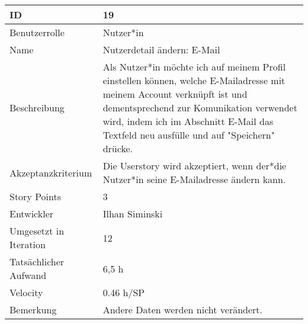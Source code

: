 \begin{tabularx}{\textwidth}{|p{}|X|}
	\hline
	ID & 19\\
	\hline
	Benutzerrolle & Nutzer*in\\
	\hline
	Name & Nutzerdetail ändern: E-Mail\\
	\hline
	Beschreibung & Als Nutzer*in möchte ich auf meinem Profil einstellen können, welche E-Mailadresse mit meinem Account verknüpft ist und dementsprechend zur Komunikation verwendet wird, indem ich im Abschnitt E-Mail das Textfeld neu ausfülle und auf "Speichern" drücke.\\
	\hline
	Akzeptanzkriterium & Die Userstory wird akzeptiert, wenn der*die Nutzer*in seine E-Mailadresse ändern kann.\\
	\hline
	Story Points & 3\\
	\hline
	Entwickler & Ilhan Siminski\\
	\hline
	Umgesetzt in Iteration & 12\\ 
	\hline
	Tatsächlicher Aufwand & 6,5 h\\
	\hline
	Velocity & 0.46 h/SP\\
	\hline
	Bemerkung & Andere Daten werden nicht verändert.\\
	\hline
\end{tabularx}
\vspace{20pt}
